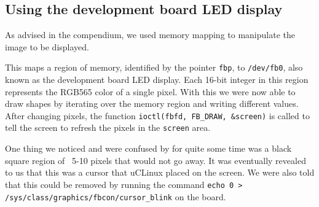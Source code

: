 \subsection{Using the development board LED display}
As advised in the compendium, we used memory mapping to manipulate the image to be displayed.



This maps a region of memory, identified by the pointer \texttt{fbp}, to \texttt{/dev/fb0}, also known as the development board LED display.
Each 16-bit integer in this region represents the RGB565 color of a single pixel.
With this we were now able to draw shapes by iterating over the memory region and writing different values.
After changing pixels, the function \texttt{ioctl(fbfd, FB\_DRAW, \&screen)} is called to tell the screen to refresh the pixels in the \texttt{screen} area.

One thing we noticed and were confused by for quite some time was a black square region of ~5-10 pixels that would not go away.
It was eventually revealed to us that this was a cursor that uCLinux placed on the screen.
We were also told that this could be removed by running the command \texttt{echo 0 > /sys/class/graphics/fbcon/cursor\_blink} on the board.
